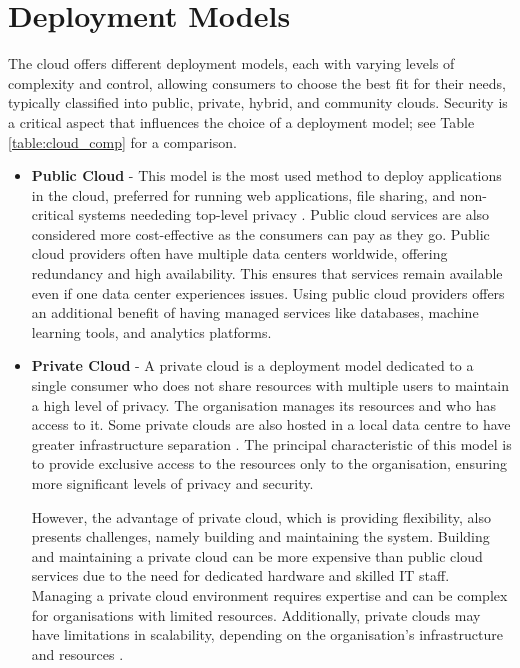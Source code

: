 \section{Deployment Models}
\label{sec:cloud_model}
The cloud offers different deployment models, each with varying levels of complexity and control, allowing consumers to choose the best fit for their needs, typically classified into public, private, hybrid, and community clouds. Security is a critical aspect that influences the choice of a deployment model; see Table \ref{table:cloud_comp} for a comparison. 
\begin{itemize}
    \item  \textbf{Public Cloud} - This model is the most used method to deploy applications in the cloud, preferred for running web applications, file sharing, and non-critical systems neededing top-level privacy \citep{cloudmodel}. Public cloud services are also considered more cost-effective as the consumers can pay as they go. Public cloud providers often have multiple data centers worldwide, offering redundancy and high availability. This ensures that services remain available even if one data center experiences issues. Using public cloud providers offers an additional benefit of having managed services like databases, machine learning tools, and analytics platforms.

    
    \item  \textbf{Private Cloud} - A private cloud is a deployment model dedicated to a single consumer who does not share resources with multiple users to maintain a high level of privacy. The organisation manages its resources and who has access to it. Some private clouds are also hosted in a local data centre to have greater infrastructure separation \citep{cloudmodel}. The principal characteristic of this model is to provide exclusive access to the resources only to the organisation, ensuring more significant levels of privacy and security. 
    
    However, the advantage of private cloud, which is providing flexibility, also presents challenges, namely building and maintaining the system. Building and maintaining a private cloud can be more expensive than public cloud services due to the need for dedicated hardware and skilled IT staff. Managing a private cloud environment requires expertise and can be complex for organisations with limited resources. Additionally, private clouds may have limitations in scalability, depending on the organisation's infrastructure and resources \citep{private_cloud}. \newline
     

\end{itemize}
